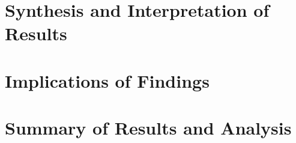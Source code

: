 \section{Synthesis and Interpretation of Results}

\section{Implications of Findings}

\section{Summary of Results and Analysis}
